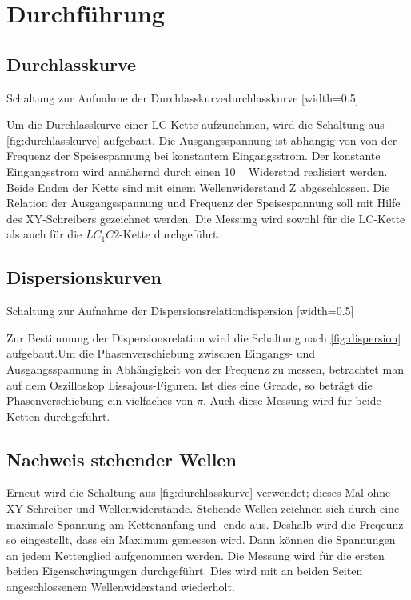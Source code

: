 \section{Durchführung}
\label{sec:Durchführung}

\subsection{Durchlasskurve}

{Schaltung zur Aufnahme der Durchlasskurve}{durchlasskurve}
[width=0.5\textwidth]

Um die Durchlasskurve einer LC-Kette aufzunehmen, wird die Schaltung aus \ref{fig:durchlasskurve}
aufgebaut. Die Ausgangsspannung ist abhängig von von der Frequenz der Speisespannung bei konstantem Eingangsstrom. Der konstante Eingangsstrom wird annähernd durch einen 10 \si{\kilo\Ohm} Widerstnd realisiert werden. Beide Enden der Kette sind mit einem Wellenwiderstand Z abgeschlossen. Die Relation der Ausgangsspannung und Frequenz der Speisespannung soll mit Hilfe des XY-Schreibers gezeichnet werden.
Die Messung wird sowohl für die LC-Kette als auch für die $LC_{1}C{2}$-Kette durchgeführt.

\subsection{Dispersionskurven}

{Schaltung zur Aufnahme der Dispersionsrelation}{dispersion}
[width=0.5\textwidth]

Zur Bestimmung der Dispersionsrelation wird die Schaltung nach \ref{fig:dispersion} aufgebaut.Um die Phasenverschiebung zwischen Eingangs- und Ausgangsspannung in Abhängigkeit von der Frequenz zu messen, betrachtet man auf dem Oszilloskop Lissajous-Figuren. Ist dies eine Greade, so beträgt die Phasenverschiebung ein vielfaches von $\pi$. Auch diese Messung wird für beide Ketten durchgeführt.

\subsection{Nachweis stehender Wellen}
Erneut wird die Schaltung aus \ref{fig:durchlasskurve} verwendet; dieses Mal ohne XY-Schreiber und Wellenwiderstände. Stehende Wellen zeichnen sich durch eine maximale Spannung am Kettenanfang und -ende aus. Deshalb wird die Freqeunz so eingestellt, dass ein Maximum gemessen wird. Dann können die Spannungen an jedem Kettenglied aufgenommen werden. Die Messung wird für die ersten beiden Eigenschwingungen durchgeführt.
Dies wird mit an beiden Seiten angeschlossenem Wellenwiderstand wiederholt.
